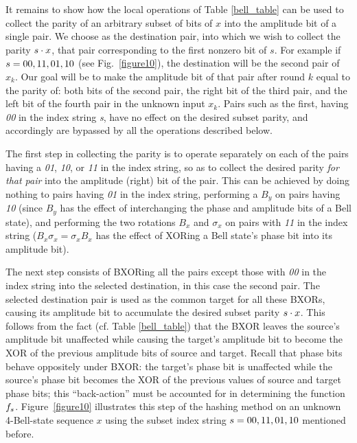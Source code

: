 It remains to show how the local operations of Table \ref{bell_table}
can be used to collect the parity of an arbitrary subset of bits of
$x$ into the amplitude bit of a single pair.  We choose as the
destination pair, into which we wish to collect the parity ${\sl
s}\cdot x$, that pair corresponding to the first nonzero bit of $s$.
For example if ${\sl s}={\sl 00,11,01,10}$ (see Fig.~\ref{figure10}),
the destination will be the second pair of $x_k$.  Our goal will be to
make the amplitude bit of that pair after round $k$ equal to the
parity of: both bits of the second pair, the right bit of the third
pair, and the left bit of the fourth pair in the unknown input $x_k$.
Pairs such as the first, having {\sl 00} in the index string {\sl s},
have no effect on the desired subset parity, and accordingly are
bypassed by all the operations described below.
 
The first step in collecting the parity is to operate separately on
each of the pairs having a {\sl 01}, {\sl 10}, or {\sl 11} in
the index string, so as to collect the desired parity {\em for that
pair\/} into the amplitude (right) bit of the pair. This can be
achieved by doing nothing to pairs having {\sl 01} in the index
string, performing a $B_y$ on pairs having {\sl 10} (since $B_y$
has the effect of interchanging the phase and amplitude bits of a Bell
state), and performing the two rotations $B_x$ and $\sigma_x$ on pairs
with {\sl 11} in the index string ($B_x\sigma_x=\sigma_xB_x$ has
the effect of XORing a Bell state's phase bit into its amplitude bit).
 
The next step consists of BXORing all the pairs except those with {\sl
00} in the index string into the selected destination, in this case
the second pair.  The selected destination pair is used as the common
target for all these BXORs, causing its amplitude bit to accumulate
the desired subset parity ${\sl s}\cdot x$.  This follows from the
fact (cf. Table \ref{bell_table}) that the BXOR leaves the source's
amplitude bit unaffected while causing the target's amplitude bit to
become the XOR of the previous amplitude bits of source and target.
Recall that phase bits behave oppositely under BXOR: the target's
phase bit is unaffected while the source's phase bit becomes the XOR
of the previous values of source and target phase bits; this
``back-action'' must be accounted for in determining the function
$f_{\sl s}$.  Figure~\ref{figure10} illustrates this step of the
hashing method on an unknown 4-Bell-state sequence $x$ using the
subset index string ${\sl s}={\sl 00,11,01,10}$ mentioned before.
 
